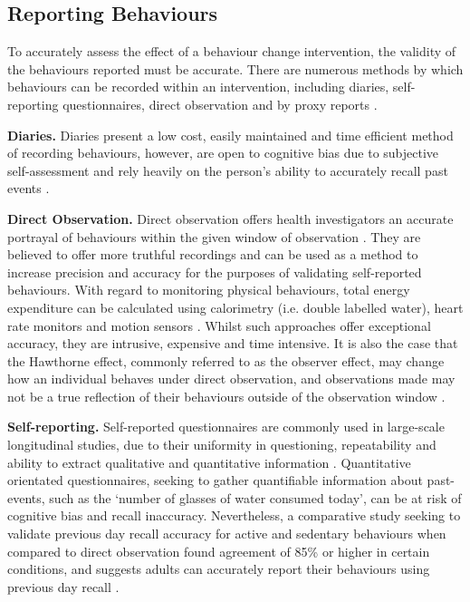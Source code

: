 \subsection{Reporting Behaviours} \label{subsection-reportingbehaviours}
To accurately assess the effect of a behaviour change intervention, the validity of the behaviours reported must be accurate. There are numerous methods by which behaviours can be recorded within an intervention, including diaries, self-reporting questionnaires, direct observation and by proxy reports \cite{Elliott2014}.

\textbf{Diaries.} Diaries present a low cost, easily maintained and time efficient method of recording behaviours, however, are open to cognitive bias due to subjective self-assessment and rely heavily on the person’s ability to accurately recall past events \cite{Stone2002}.

\textbf{Direct Observation.} Direct observation offers health investigators an accurate portrayal of behaviours within the given window of observation \cite{Prince2008}. They are believed to offer more truthful recordings and can be used as a method to increase precision and accuracy for the purposes of validating self-reported behaviours. With regard to monitoring physical behaviours, total energy expenditure can be calculated using calorimetry (i.e. double labelled water), heart rate monitors and motion sensors \cite{Prince2008}. Whilst such approaches offer exceptional accuracy, they are intrusive, expensive and time intensive. It is also the case that the Hawthorne effect, commonly referred to as the observer effect, may change how an individual behaves under direct observation, and observations made may not be a true reflection of their behaviours outside of the observation window \cite{McCarney2007}.

\textbf{Self-reporting.} Self-reported questionnaires are commonly used in large-scale longitudinal studies, due to their uniformity in questioning, repeatability and ability to extract qualitative and quantitative information \cite{DiMarco2014}. Quantitative orientated questionnaires, seeking to gather quantifiable information about past-events, such as the ‘number of glasses of water consumed today’, can be at risk of cognitive bias and recall inaccuracy. Nevertheless, a comparative study seeking to validate previous day recall accuracy for active and sedentary behaviours when compared to direct observation found agreement of 85\% or higher in certain conditions, and suggests adults can accurately report their behaviours using previous day recall \cite{KozeyKeadle2014}.

